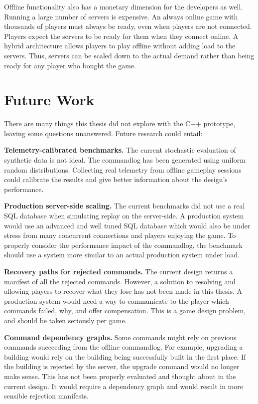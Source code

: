 \documentclass{article}
\begin{document}
Offline functionality also has a monetary dimension for the developers as well. Running a large number of servers is expensive. An always online game with thousands of players must always be ready, even when players are not connected. Players expect the servers to be ready for them when they connect online. A hybrid architecture allows players to play offline without adding load to the servers. Thus, servers can be scaled down to the actual demand rather than being ready for any player who bought the game.

\newpage

\section{Future Work}
\label{sec:futurework}

There are many things this thesis did not explore with the C++ prototype, leaving some questions unanswered. Future research could entail:

\textbf{Telemetry-calibrated benchmarks.} The current stochastic evaluation of synthetic data is not ideal. The commandlog has been generated using uniform random distributions. Collecting real telemetry from offline gameplay sessions could calibrate the results and give better information about the design's performance.

\textbf{Production server-side scaling.} The current benchmarks did not use a real SQL database when simulating replay on the server-side. A production system would use an advanced and well tuned SQL database which would also be under stress from many concurrent connections and players enjoying the game. To properly consider the performance impact of the commandlog, the benchmark should use a system more similar to an actual production system under load.

\textbf{Recovery paths for rejected commands.} The current design returns a manifest of all the rejected commands. However, a solution to resolving and allowing players to recover what they lose has not been made in this thesis. A production system would need a way to communicate to the player which commands failed, why, and offer compensation. This is a game design problem, and should be taken seriously per game.

\textbf{Command dependency graphs.} Some commands might rely on previous commands succeeding from the offline commandlog. For example, upgrading a building would rely on the building being successfully built in the first place. If the building is rejected by the server, the upgrade command would no longer make sense. This has not been properly evaluated and thought about in the current design. It would require a dependency graph and would result in more sensible rejection manifests.
\end{document}
